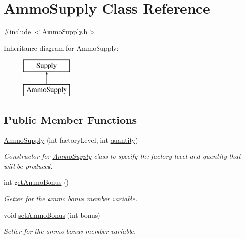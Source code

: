\hypertarget{class_ammo_supply}{}\section{Ammo\+Supply Class Reference}
\label{class_ammo_supply}


{\ttfamily \#include $<$Ammo\+Supply.\+h$>$}

Inheritance diagram for Ammo\+Supply\+:\begin{figure}[H]
\begin{center}
\leavevmode
\includegraphics[height=2.000000cm]{class_ammo_supply}
\end{center}
\end{figure}
\subsection*{Public Member Functions}
\begin{DoxyCompactItemize}
\item 
\mbox{\hyperlink{class_ammo_supply_a7a39f58fb5ef1b4ea058f38bba9b2d3d}{Ammo\+Supply}} (int factory\+Level, int \mbox{\hyperlink{class_supply_a947a0ffbf0c36dc21d79c05f1a9f48a4}{quantity}})
\begin{DoxyCompactList}\small\item\em Constructor for \mbox{\hyperlink{class_ammo_supply}{Ammo\+Supply}} class to specify the factory level and quantity that will be produced. \end{DoxyCompactList}\item 
int \mbox{\hyperlink{class_ammo_supply_a0bb29802e0d64f63d25c10d0cafa71f8}{get\+Ammo\+Bonus}} ()
\begin{DoxyCompactList}\small\item\em Getter for the ammo bonus member variable. \end{DoxyCompactList}\item 
void \mbox{\hyperlink{class_ammo_supply_a39af493b4b03a58a57b347ebf61c8f73}{set\+Ammo\+Bonus}} (int bonus)
\begin{DoxyCompactList}\small\item\em Setter for the ammo bonus member variable. \end{DoxyCompactList}\end{DoxyCompactItemize}
